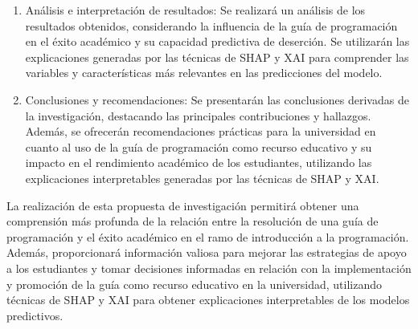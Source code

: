 \begin{enumerate}
    \item Análisis e interpretación de resultados: Se realizará un análisis de los resultados obtenidos, considerando la influencia de la guía de programación en el éxito académico y su capacidad predictiva de deserción. Se utilizarán las explicaciones generadas por las técnicas de SHAP y XAI para comprender las variables y características más relevantes en las predicciones del modelo.

    \item Conclusiones y recomendaciones: Se presentarán las conclusiones derivadas de la investigación, destacando las principales contribuciones y hallazgos. Además, se ofrecerán recomendaciones prácticas para la universidad en cuanto al uso de la guía de programación como recurso educativo y su impacto en el rendimiento académico de los estudiantes, utilizando las explicaciones interpretables generadas por las técnicas de SHAP y XAI.

\end{enumerate}

La realización de esta propuesta de investigación permitirá obtener una comprensión más profunda de la relación entre la resolución de una guía de programación y el éxito académico en el ramo de introducción a la programación. Además, proporcionará información valiosa para mejorar las estrategias de apoyo a los estudiantes y tomar decisiones informadas en relación con la implementación y promoción de la guía como recurso educativo en la universidad, utilizando técnicas de SHAP y XAI para obtener explicaciones interpretables de los modelos predictivos.


